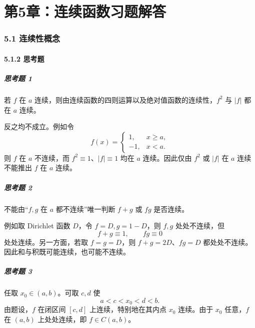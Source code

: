 
\chapter*{第5章：连续函数习题解答}
\subsection*{5.1 连续性概念}

\subsubsection*{5.1.2 思考题}

\paragraph{思考题 1}
\begin{xsolution}
若 $f$ 在 $a$ 连续，则由连续函数的四则运算以及绝对值函数的连续性，$f^2$ 与 $|f|$ 都在 $a$ 连续。

反之均不成立。例如令
\[
 f(x)=\begin{cases}
  1,&x\ge a,\\
  -1,&x<a.
 \end{cases}
\]
则 $f$ 在 $a$ 不连续，而 $f^2\equiv1$、$|f|\equiv1$ 均在 $a$ 连续。因此仅由 $f^2$ 或 $|f|$ 在 $a$ 连续不能推出 $f$ 在 $a$ 连续。
\end{xsolution}

\paragraph{思考题 2}
\begin{xsolution}
不能由“$f,g$ 在 $a$ 都不连续”唯一判断 $f+g$ 或 $fg$ 是否连续。

例如取 Dirichlet 函数 $D$，令 $f=D,g=1-D$，则 $f,g$ 处处不连续，但
\[
 f+g\equiv1,\qquad fg\equiv0
\]
处处连续。另一方面，若取 $f=g=D$，则 $f+g=2D$、$fg=D$ 都处处不连续。因此和与积既可能连续，也可能不连续。
\end{xsolution}

\paragraph{思考题 3}
\begin{xsolution}
任取 $x_0\in(a,b)$。可取 $c,d$ 使
\[
 a<c<x_0<d<b.
\]
由题设，$f$ 在闭区间 $[c,d]$ 上连续，特别地在其内点 $x_0$ 连续。由于 $x_0$ 任意，$f$ 在 $(a,b)$ 上处处连续，即 $f\in C(a,b)$。
\end{xsolution}

